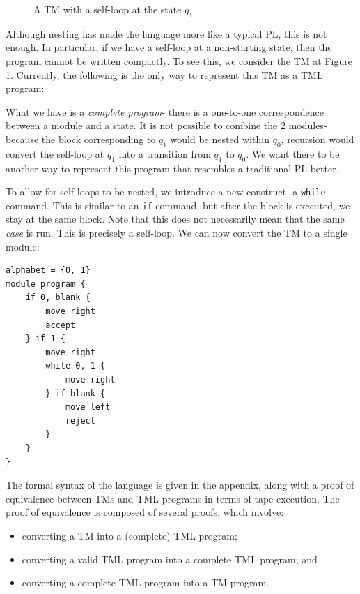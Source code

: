 \begin{figure}[htb]
    \centering
    \caption{A TM with a self-loop at the state $q_1$}
    \label{fig:self-loop-TM}
\end{figure}
Although nesting has made the language more like a typical PL, this is not enough. In particular, if we have a self-loop at a non-starting state, then the program cannot be written compactly. To see this, we consider the TM at Figure \ref{fig:self-loop-TM}. Currently, the following is the only way to represent this TM as a TML program:

What we have is a \emph{complete program}- there is a one-to-one correspondence between a module and a state. It is not possible to combine the 2 modules- because the block corresponding to $q_1$ would be nested within $q_0$, recursion would convert the self-loop at $q_1$ into a transition from $q_1$ to $q_0$. We want there to be another way to represent this program that resembles a traditional PL better.

To allow for self-loops to be nested, we introduce a new construct- a \texttt{while} command. This is similar to an \texttt{if} command, but after the block is executed, we stay at the same block. Note that this does not necessarily mean that the same \textit{case} is run. This is precisely a self-loop. We can now convert the TM to a single module:
\begin{lstlisting}[language=TML]
alphabet = {0, 1}
module program {
    if 0, blank {
        move right
        accept
    } if 1 {
        move right
        while 0, 1 {
            move right
        } if blank {
            move left
            reject
        }
    }
}
\end{lstlisting}

The formal syntax of the language is given in the appendix, along with a proof of equivalence between TMs and TML programs in terms of tape execution. The proof of equivalence is composed of several proofs, which involve:
\begin{itemize}
    \item converting a TM into a (complete) TML program;
    \item converting a valid TML program into a complete TML program; and
    \item converting a complete TML program into a TM program.
\end{itemize}

